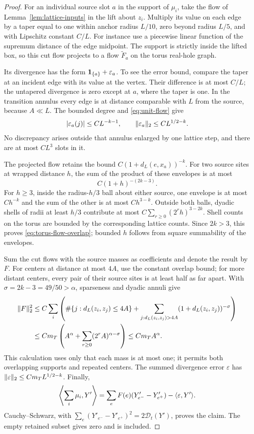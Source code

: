 \begin{proof}
For an individual source slot \(a\) in the support of \(\mu_i\),
take the flow of Lemma~\ref{lem:lattice-inputs} in the lift about
\(z_i\).  Multiply its value on each edge by a taper equal to one
within anchor radius \(L/10\), zero beyond radius \(L/5\), and
with Lipschitz constant \(C/L\).  For instance use a piecewise linear
function of the supremum distance of the edge midpoint.  The support
is strictly inside the lifted box, so this cut flow projects to a flow
\(\widetilde F_a\) on the torus real-hole graph.

Its divergence has the form \(\mathbf1_{\{a\}}+\varepsilon_a\).
To see the error bound, compare the taper at an incident edge with
its value at the vertex.  Their difference is at most \(C/L\);
the untapered divergence is zero except at \(a\), where the taper
is one.  In the transition annulus every edge is at distance comparable
with \(L\) from the source, because \(A\ll L\).  The bounded
degree and \eqref{eq:unit-flow} give
\[
 |\varepsilon_a(j)|\le CL^{-k-1},\qquad
 \lVert\varepsilon_a\rVert_2\le CL^{1/2-k}.
\]
No discrepancy arises outside that annulus enlarged by one lattice
step, and there are at most
\(CL^3\) slots in it.

The projected flow retains the bound
\(C(1+d_L(e,x_a))^{-k}\).  For two source sites at wrapped
distance \(h\), the sum of the product of these envelopes is at most
\begin{equation}\label{eq:torus-flow-overlap}
 C(1+h)^{-(2k-3)}.
\end{equation}
For \(h\ge3\), inside the radius-\(h/3\) ball about either source,
one envelope is at most \(Ch^{-k}\) and the sum of the other is at
most \(Ch^{3-k}\).  Outside both balls, dyadic shells of radii at
least \(h/3\) contribute at most
\(C\sum_{r\ge0}(2^rh)^{3-2k}\).  Shell counts on the torus are
bounded by the corresponding lattice counts.  Since \(2k>3\),
this proves \eqref{eq:torus-flow-overlap}; bounded \(h\) follows
from square summability of the envelopes.

Sum the cut flows with the source masses as coefficients and denote
the result by \(F\).  For centers at distance at most \(4A\),
use the constant overlap bound; for more distant centers, every pair
of their source sites is at least half as far apart.  With
\(\sigma=2k-3=49/50>\alpha\), sparseness and dyadic annuli give
\begin{align*}
 \lVert F\rVert_2^2
 &\le C\sum_i\left(\#\{j:d_L(z_i,z_j)\le4A\}
       +\sum_{j:d_L(z_i,z_j)>4A}(1+d_L(z_i,z_j))^{-\sigma}\right)\\
 &\le Cm_T\left(A^\alpha+
          \sum_{r\ge0}(2^rA)^{\alpha-\sigma}\right)
 \le Cm_TA^\alpha.
\end{align*}
This calculation uses only that each mass is at most one; it permits
both overlapping supports and repeated centers.  The summed divergence
error \(\varepsilon\) has
\(\lVert\varepsilon\rVert_2\le Cm_TL^{1/2-k}\).  Finally,
\[
 \left\langle\sum_i\mu_i,Y'\right\rangle
 =\sum_eF(e)(Y'_{e^-}-Y'_{e^+})-\langle\varepsilon,Y'\rangle.
\]
Cauchy--Schwarz, with
\(\sum_e(Y'_{e^-}-Y'_{e^+})^2=2\mathcal D_t(Y')\), proves the
claim.  The empty retained subset gives zero and is included.
\end{proof}

